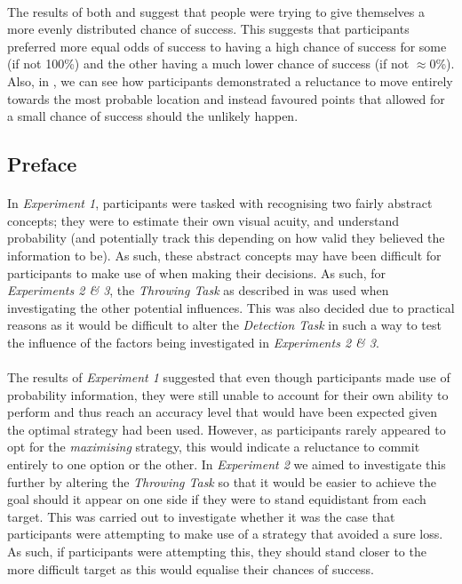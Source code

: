 \documentclass[12pt]{article}
\begin{document}
\paragraph{} The results of both \cite{CHAPMAN2010168} and \cite{Hudson2007probmove} suggest that people were trying to give themselves a more evenly distributed chance of success. This suggests that participants preferred more equal odds of success to having a high chance of success for some (if not 100\%) and the other having a much lower chance of success (if not $\approx$0\%). Also, in \cite{Hudson2007probmove}, we can see how participants demonstrated a reluctance to move entirely towards the most probable location and instead favoured points that allowed for a small chance of success should the unlikely happen.

\subsection*{Preface}
\paragraph{} In \textit{Experiment 1}, participants were tasked with recognising two fairly abstract concepts; they were to estimate their own visual acuity, and understand probability (and potentially track this depending on how valid they believed the information to be). As such, these abstract concepts may have been difficult for participants to make use of when making their decisions. As such, for \textit{Experiments 2 \& 3}, the \textit{Throwing Task} as described in \cite{clarke2015failure} was used when investigating the other potential influences. This was also decided due to practical reasons as it would be difficult to alter the \textit{Detection Task} in such a way to test the influence of the factors being investigated in \textit{Experiments 2 \& 3}. 

\paragraph{} The results of \textit{Experiment 1} suggested that even though participants made use of probability information, they were still unable to account for their own ability to perform and thus reach an accuracy level that would have been expected given the optimal strategy had been used. However, as participants rarely appeared to opt for the \textit{maximising} strategy, this would indicate a reluctance to commit entirely to one option or the other. In \textit{Experiment 2} we aimed to investigate this further by altering the \textit{Throwing Task} \citep{clarke2015failure} so that it would be easier to achieve the goal should it appear on one side if they were to stand equidistant from each target. This was carried out to investigate whether it was the case that participants were attempting to make use of a strategy that avoided a sure loss. As such, if participants were attempting this, they should stand closer to the more difficult target as this would equalise their chances of success. 
 
\end{document}

